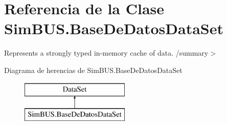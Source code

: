 \section{Referencia de la Clase Sim\-B\-U\-S.\-Base\-De\-Datos\-Data\-Set}
\label{class_sim_b_u_s_1_1_base_de_datos_data_set}


Represents a strongly typed in-\/memory cache of data. /summary$>$  


Diagrama de herencias de Sim\-B\-U\-S.\-Base\-De\-Datos\-Data\-Set\begin{figure}[H]
\begin{center}
\leavevmode
\includegraphics[height=2.000000cm]{class_sim_b_u_s_1_1_base_de_datos_data_set}
\end{center}
\end{figure}
